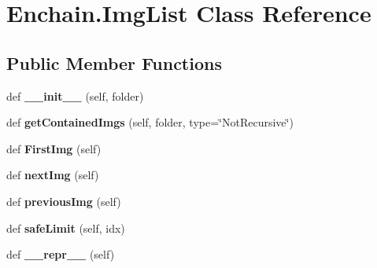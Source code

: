 \hypertarget{classEnchain_1_1ImgList}{}\section{Enchain.\+Img\+List Class Reference}
\label{classEnchain_1_1ImgList}
\subsection*{Public Member Functions}
\begin{DoxyCompactItemize}
\item 
def {\bfseries \+\_\+\+\_\+init\+\_\+\+\_\+} (self, folder)\hypertarget{classEnchain_1_1ImgList_ad0c2329676c49fb4f5d7c9cfb2891140}{}\label{classEnchain_1_1ImgList_ad0c2329676c49fb4f5d7c9cfb2891140}

\item 
def {\bfseries get\+Contained\+Imgs} (self, folder, type=\char`\"{}Not\+Recursive\char`\"{})\hypertarget{classEnchain_1_1ImgList_a5db106b9f9b6b5b6561061d6fd4b6ad5}{}\label{classEnchain_1_1ImgList_a5db106b9f9b6b5b6561061d6fd4b6ad5}

\item 
def {\bfseries First\+Img} (self)\hypertarget{classEnchain_1_1ImgList_af3b8190bfe73613f139d70c87dfef006}{}\label{classEnchain_1_1ImgList_af3b8190bfe73613f139d70c87dfef006}

\item 
def {\bfseries next\+Img} (self)\hypertarget{classEnchain_1_1ImgList_a5bf5c2f72a59f91838a2986be48b50ac}{}\label{classEnchain_1_1ImgList_a5bf5c2f72a59f91838a2986be48b50ac}

\item 
def {\bfseries previous\+Img} (self)\hypertarget{classEnchain_1_1ImgList_ae986be383da7305bf921f3190827996a}{}\label{classEnchain_1_1ImgList_ae986be383da7305bf921f3190827996a}

\item 
def {\bfseries safe\+Limit} (self, idx)\hypertarget{classEnchain_1_1ImgList_a0d9f0228c7a5bb3466303786e2ee5596}{}\label{classEnchain_1_1ImgList_a0d9f0228c7a5bb3466303786e2ee5596}

\item 
def {\bfseries \+\_\+\+\_\+repr\+\_\+\+\_\+} (self)\hypertarget{classEnchain_1_1ImgList_aae29610f2afed38619ed598002ffef86}{}\label{classEnchain_1_1ImgList_aae29610f2afed38619ed598002ffef86}

\end{DoxyCompactItemize}
